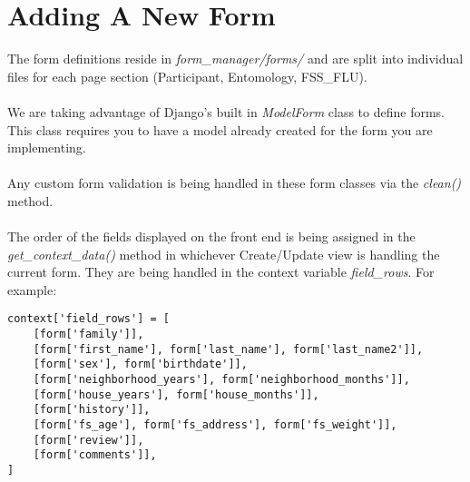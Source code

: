 \documentclass{article}
\begin{document}
\section{Adding A New Form}
The form definitions reside in \textit{form\_manager/forms/} and are split into individual files for each page section (Participant, Entomology, FSS\_FLU). 
\\\\We are taking advantage of Django's built in \textit{ModelForm} class to define forms. This class requires you to have a model already created for the form you are implementing.
\\\\Any custom form validation is being handled in these form classes via the \textit{clean()} method.
\\\\The order of the fields displayed on the front end is being assigned in the \textit{get\_context\_data()} method in whichever Create/Update view is handling the current form.  They are being handled in the context variable \textit{field\_rows}.  For example:
\begin{verbatim}
context['field_rows'] = [
    [form['family']],
    [form['first_name'], form['last_name'], form['last_name2']],
    [form['sex'], form['birthdate']],
    [form['neighborhood_years'], form['neighborhood_months']],
    [form['house_years'], form['house_months']],
    [form['history']],
    [form['fs_age'], form['fs_address'], form['fs_weight']],
    [form['review']],
    [form['comments']],
]
\end{verbatim}
\end{document}
